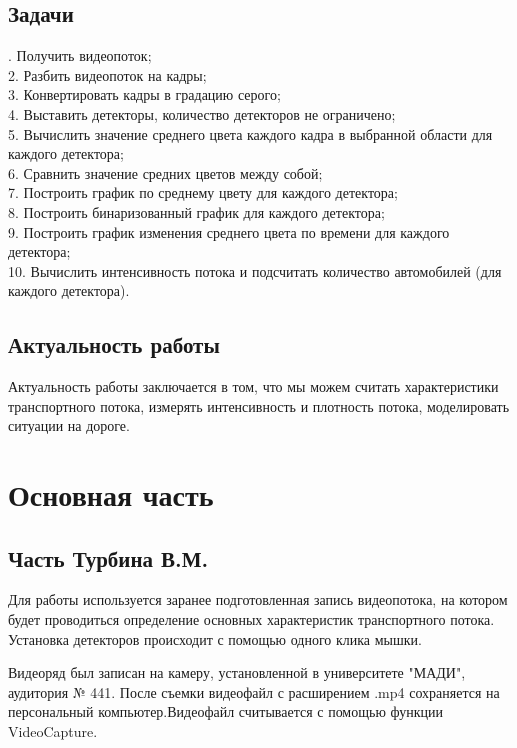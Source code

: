 \documentclass[a4paper,12pt]{article}
\begin{document}
\subsection{Задачи} 
. Получить видеопоток;\\
2. Разбить видеопоток на кадры;\\
3. Конвертировать кадры в градацию серого;\\
4. Выставить детекторы, количество детекторов не ограничено;\\
5. Вычислить значение среднего цвета каждого кадра в выбранной области для каждого детектора;\\
6. Сравнить значение средних цветов между собой;\\
7. Построить график по среднему цвету для каждого детектора;\\
8. Построить бинаризованный график для каждого детектора;\\
9. Построить график изменения среднего цвета по времени для каждого детектора;\\
10. Вычислить интенсивность потока и подсчитать количество автомобилей (для каждого детектора).


\subsection{Актуальность работы}
Актуальность работы заключается в том, что мы можем считать характеристики транспортного потока, измерять интенсивность и плотность потока, моделировать ситуации на дороге. 

\newpage

\section{Основная часть}

\subsection{Часть Турбина В.М.}

Для работы используется заранее подготовленная запись видеопотока, на котором будет проводиться определение основных характеристик транспортного потока. 
Установка детекторов происходит с помощью одного клика мышки.


Видеоряд был записан на камеру, установленной в университете "МАДИ", аудитория № 441. После съемки видеофайл с расширением .mp4 сохраняется на персональный компьютер.Видеофайл считывается с помощью функции VideoCapture.
\end{document}
